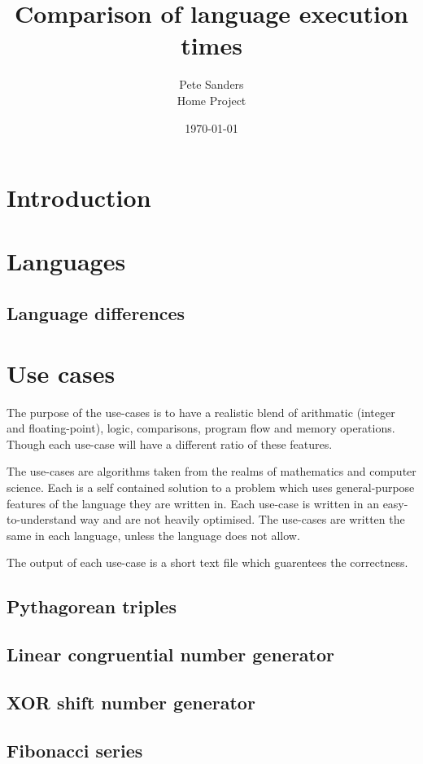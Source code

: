 \documentclass[a4paper,11pt]{article}
\title{Comparison of language execution times}
\author{Pete Sanders  \\
	Home Project
	}
\date{\today}
\begin{document}
\maketitle

\tableofcontents

\section{Introduction}

\section{Languages}

\subsection{Language differences}

\section{Use cases}

The purpose of the use-cases is to have a realistic blend of arithmatic (integer and floating-point), logic, 
comparisons, program flow and memory operations. Though each use-case will have a different ratio of these features.

The use-cases are algorithms taken from the realms of mathematics and computer science.
Each is a self contained solution to a problem which uses general-purpose features 
of the language they are written in. Each use-case is written in an easy-to-understand way
and are not heavily optimised. 
The use-cases are written the same in each language, unless the language does not allow.

The output of each use-case is a short text file which guarentees the correctness. 

\subsection{Pythagorean triples}
\subsection{Linear congruential number generator}
\subsection{XOR shift number generator}
\subsection{Fibonacci series}
\end{document}
